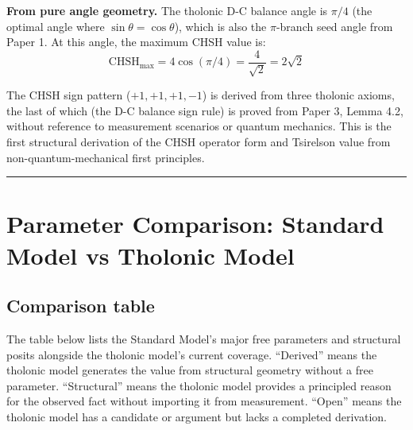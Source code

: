 \documentclass[12pt]{article}
\begin{document}
\textbf{From pure angle geometry.} The tholonic D-C balance angle is
\(\pi/4\) (the optimal angle where \(\sin\theta = \cos\theta\)), which
is also the \(\pi\)-branch seed angle from Paper 1. At this angle, the
maximum CHSH value is:
\[\text{CHSH}_{\max} = 4\cos(\pi/4) = \frac{4}{\sqrt{2}} = 2\sqrt{2}\]

The CHSH sign pattern (\(+1, +1, +1, -1\)) is derived from three
tholonic axioms, the last of which (the D-C balance sign rule) is proved
from Paper 3, Lemma 4.2, without reference to measurement scenarios or
quantum mechanics. This is the first structural derivation of the CHSH
operator form and Tsirelson value from non-quantum-mechanical first
principles.

\begin{center}\rule{0.5\linewidth}{0.5pt}\end{center}

\section{Parameter Comparison: Standard Model vs Tholonic Model}\label{parameter-comparison-standard-model-vs-tholonic-model}

\subsection{Comparison table}\label{comparison-table}

The table below lists the Standard Model's major free parameters and
structural posits alongside the tholonic model's current coverage.
``Derived'' means the tholonic model generates the value from structural
geometry without a free parameter. ``Structural'' means the tholonic
model provides a principled reason for the observed fact without
importing it from measurement. ``Open'' means the tholonic model has a
candidate or argument but lacks a completed derivation.
\end{document}
